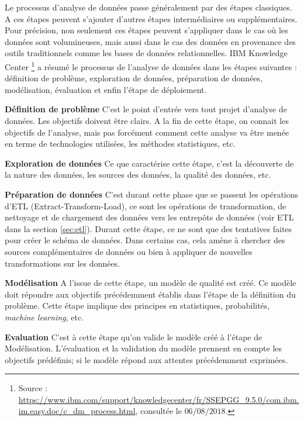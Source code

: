 Le processus d'analyse de données passe généralement par des étapes classiques. A ces étapes peuvent s'ajouter d'autres étapes intermédiaires ou supplémentaires. 
Pour précision, non seulement  ces étapes peuvent s'appliquer dans le cas  où les données sont volumineuses,  mais aussi dans le cas des données en provenance des outils traditionnels comme les bases de données relationnelles. IBM Knowledge Center \footnote{Source : \url{https://www.ibm.com/support/knowledgecenter/fr/SSEPGG_9.5.0/com.ibm.im.easy.doc/c_dm_process.html}, consultée le $06/08/2018$.} a résumé le processus de l'analyse de données dans les étapes suivantes :
définition de problème, exploration de données, préparation de données, modélisation, évaluation et enfin l'étape de déploiement.


\textbf{Définition de problème} C'est le point d'entrée vers tout projet d'analyse de données. Les objectifs doivent être clairs. A la fin de cette étape, on connait les objectifs de l'analyse, mais pas forcément comment cette analyse va être menée en terme de technologies utilisées,  les méthodes statistiques, etc. \par

\textbf{Exploration de données } Ce que caractérise cette étape, c'est la découverte de la nature  des données, les sources des données, la qualité des données, etc. \par

\textbf{Préparation de données} \label{par:step-preparedata} C'est durant cette phase que se passent les opérations d'ETL (Extract-Transform-Load), ce sont les opérations de transformation, de nettoyage et de chargement des données vers les entrepôts de données (voir ETL dans la section \ref{sec:etl}). Durant cette étape,  ce ne sont que  des tentatives  faites pour créer le schéma de données.  Dans certains cas, cela amène  à chercher des sources complémentaires de données ou bien à appliquer de nouvelles transformations  sur les données. \par

\textbf{Modélisation} A l'issue de cette étape, un modèle de qualité est créé. Ce modèle  doit  répondre aux objectifs précédemment établis dans l'étape de la définition du problème. Cette étape implique des principes en statistiques, probabilités, \textit{machine learning}, etc. \par

\textbf{Evaluation} C'est à cette étape qu'on valide le modèle créé à l'étape de  Modélisation. L'évaluation et la validation du modèle prennent en compte les objectifs prédéfinis; si le modèle répond aux attentes précédemment exprimées. \par

